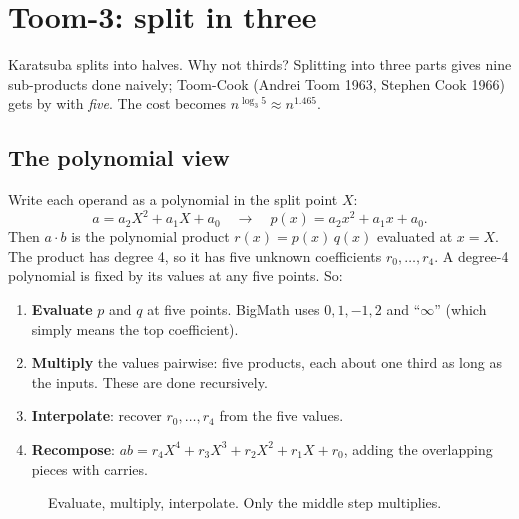 \section{Toom-3: split in three}
\label{sec:toom}

Karatsuba splits into halves. Why not thirds? Splitting into three parts gives
nine sub-products done naively; Toom-Cook (Andrei Toom 1963, Stephen Cook 1966) gets by
with \emph{five}. The cost becomes $n^{\log_3 5} \approx n^{1.465}$.

\subsection{The polynomial view}

Write each operand as a polynomial in the split point $X$:
\[
a = a_2 X^2 + a_1 X + a_0 \quad\longrightarrow\quad p(x) = a_2 x^2 + a_1 x + a_0 .
\]
Then $a \cdot b$ is the polynomial product $r(x) = p(x)\,q(x)$ evaluated at $x = X$. The
product has degree 4, so it has five unknown coefficients $r_0,\dots,r_4$. A degree-4
polynomial is fixed by its values at any five points. So:

\begin{enumerate}
  \item \textbf{Evaluate} $p$ and $q$ at five points. BigMath uses $0, 1, -1, 2$ and
        ``$\infty$'' (which simply means the top coefficient).
  \item \textbf{Multiply} the values pairwise: five products, each about one third as long
        as the inputs. These are done recursively.
  \item \textbf{Interpolate}: recover $r_0,\dots,r_4$ from the five values.
  \item \textbf{Recompose}: $a b = r_4 X^4 + r_3 X^3 + r_2 X^2 + r_1 X + r_0$, adding the
        overlapping pieces with carries.
\end{enumerate}

\begin{figure}[ht]
\centering
{}
\caption{Evaluate, multiply, interpolate. Only the middle step multiplies.}
\label{fig:evalinterp}
\end{figure}

